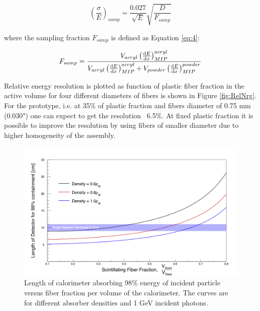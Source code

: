  \begin{equation} \label{eq:3}
     \left( \frac{\sigma}{E} \right)_{samp} = \frac{0.027}{\sqrt{E}}\sqrt{\frac{D}{F_{samp}}}
 \end{equation}
 
 where the sampling fraction $F_{samp}$ is defined as Equation \ref{eq:4}:
 
 \begin{equation} \label{eq:4}
     F_{samp} = \frac{ V_{acryl} \left( \dv{E}{x} \right)_{MIP}^{acryl} }{ V_{acryl} \left( \dv{E}{x} \right)_{MIP}^{acryl} + V_{powder} \left( \dv{E}{x} \right)_{MIP}^{powder} }
 \end{equation}
 
 Relative energy resolution is plotted as function of plastic fiber fraction in the active volume for four different diameters of fibers is shown in Figure \ref{fig:RelNrg}. For the prototype, i.e. at 35\% of plastic fraction and fibers diameter of 0.75 mm (0.030") one can expect to get the resolution ~6.5\%. At fixed plastic fraction it is possible to improve the resolution by using fibers of smaller diameter due to higher homogeneity of the assembly.
 
\begin{figure}[h]
\centering
\includegraphics[width=0.95\linewidth]{images/Fig10_Length.png}
\caption{Length of calorimeter absorbing 98\% energy of incident particle versus fiber fraction per volume of the calorimeter. The curves are for different absorber densities and 1 GeV incident photons.}
\label{fig:Length}
\end{figure}

